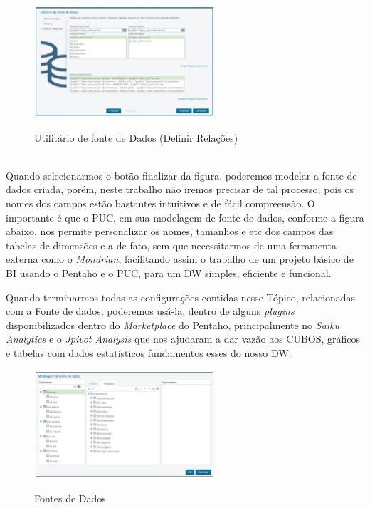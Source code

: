 \begin{figure}[H]
	\vspace*{0,2cm}
    \centering
    \caption{Utilit\'{a}rio de fonte de Dados (Definir Rela\c{c}\~{o}es)}
    \includegraphics[width=0.6\textwidth]{./04-figuras/figura-puc-utiliario-fonte-de-dados-relacoes}
    \label{fig:ilustfigpucutiliariofontededadosrelacoes}
\end{figure}
\vspace*{-0,9cm}
{\raggedright {}} \\

Quando selecionarmos o bot\~{a}o finalizar da figura, poderemos modelar a fonte de dados 
criada, por\'{e}m, neste trabalho n\~{a}o iremos precisar de tal processo, pois os nomes dos campos 
est\~{a}o bastantes intuitivos e de f\'{a}cil compreens\~{a}o. O importante \'{e} que o PUC, em sua modelagem 
de fonte de dados, conforme a figura abaixo, nos permite personalizar os nomes, tamanhos e etc dos 
campos das tabelas de dimens\~{o}es e a de fato, sem que necessitarmos de uma ferramenta externa como 
o \textit{Mondrian}, facilitando assim o trabalho de um projeto b\'{a}sico de BI usando o Pentaho e o PUC, para 
um DW simples, eficiente e funcional.

Quando terminarmos todas as configura\c{c}\~{o}es contidas nesse T\'{o}pico, relacionadas com a Fonte de dados, 
poderemos us\'{a}-la, dentro de alguns \textit{plugins} disponibilizados dentro do \textit{Marketplace} do Pentaho, principalmente
 no \textit{Saiku Analytics} e o \textit{Jpivot Analysis} que nos ajudaram a dar vaz\~{a}o aos CUBOS, gr\'{a}ficos e tabelas com dados 
 estat\'{i}sticos fundamentos esses do nosso DW.

 \begin{figure}[H]
	\vspace*{0,2cm}
    \centering
    \caption{Fontes de Dados}
    \includegraphics[width=0.6\textwidth]{./04-figuras/figura-puc-modelagem-fonte-de-dados}
    \label{fig:ilustfigpucmodelagemfontededados}
\end{figure}
\vspace*{-0,9cm}
{\raggedright {}} \\

